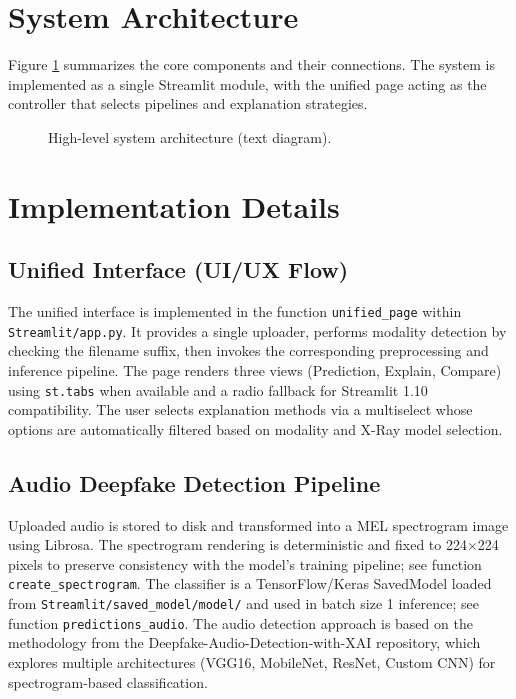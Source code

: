 \documentclass[11pt,a4paper]{article}
\begin{document}
\section{System Architecture}
Figure \ref{fig:arch} summarizes the core components and their connections. The system is implemented as a single Streamlit module, with the unified page acting as the controller that selects pipelines and explanation strategies.

\begin{figure}[h]
\centering
{}
\caption{High-level system architecture (text diagram).}
\label{fig:arch}
\end{figure}

\section{Implementation Details}
\subsection{Unified Interface (UI/UX Flow)}
The unified interface is implemented in the function \texttt{unified\_page} within \texttt{Streamlit/app.py}. It provides a single uploader, performs modality detection by checking the filename suffix, then invokes the corresponding preprocessing and inference pipeline. The page renders three views (Prediction, Explain, Compare) using \texttt{st.tabs} when available and a radio fallback for Streamlit 1.10 compatibility. The user selects explanation methods via a multiselect whose options are automatically filtered based on modality and X-Ray model selection.

\subsection{Audio Deepfake Detection Pipeline}
Uploaded audio is stored to disk and transformed into a MEL spectrogram image using Librosa. The spectrogram rendering is deterministic and fixed to 224$\times$224 pixels to preserve consistency with the model's training pipeline; see function \texttt{create\_spectrogram}. The classifier is a TensorFlow/Keras SavedModel loaded from \texttt{Streamlit/saved\_model/model/} and used in batch size 1 inference; see function \texttt{predictions\_audio}. The audio detection approach is based on the methodology from the Deepfake-Audio-Detection-with-XAI repository, which explores multiple architectures (VGG16, MobileNet, ResNet, Custom CNN) for spectrogram-based classification.
\end{document}
